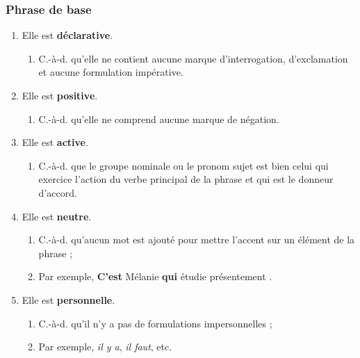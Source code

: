 \documentclass[10pt, french]{article}
\begin{document}
\begin{multicols*}{2}
\subsubsection*{Phrase de base}
\begin{definitionNOHFILLprop}
\begin{enumerate}
	\item	Elle est \textbf{déclarative}.
		\begin{enumerate}
		\item	C.-à-d. qu'elle ne contient aucune marque d'interrogation, d'exclamation et aucune formulation impérative.
		\end{enumerate}
	\item	Elle est \textbf{positive}.
		\begin{enumerate}
		\item	C.-à-d. qu'elle ne comprend aucune marque de négation.
		\end{enumerate}
	\item	Elle est \textbf{active}.
		\begin{enumerate}
		\item	C.-à-d. que le groupe nominale ou le pronom sujet est bien celui qui exercice l'action du verbe principal de la phrase et qui est le donneur d'accord.
		\end{enumerate}
	\item	Elle est \textbf{neutre}.
		\begin{enumerate}
		\item	C.-à-d. qu'aucun mot est ajouté pour mettre l'accent sur un élément de la phrase ;
		\item	Par exemple, \og \textbf{C'est} Mélanie \textbf{qui} étudie présentement \fg{}.
		\end{enumerate}
	\item	Elle est \textbf{personnelle}.
		\begin{enumerate}
		\item	C.-à-d. qu'il n'y a pas de formulations impersonnelles ;
		\item	Par exemple, \textit{il y a}, \textit{il faut}, etc.
		\end{enumerate}
\end{enumerate}
\end{definitionNOHFILLprop}


\end{multicols*}
\end{document}
